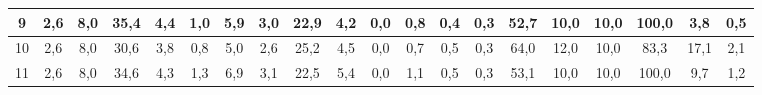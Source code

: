 \begin{sidewaystable}[]
\begin{tabular}{|c|c|c|c|c|c|c|c|c|c|c|c|c|c|c|c|c|c|c|c|}
    9  & 2,6                                              & 8,0                                              & 35,4                                             & 4,4                                              & 1,0                                              & 5,9                                              & 3,0                                              & 22,9                                             & 4,2                                              & 0,0                                              & 0,8                                              & 0,4                                              & 0,3                                              & 52,7                                            & 10,0                                            & 10,0                                            & 100,0                                           & 3,8                                             & 0,5                                             \\ \hline
    10 & 2,6                                              & 8,0                                              & 30,6                                             & 3,8                                              & 0,8                                              & 5,0                                              & 2,6                                              & 25,2                                             & 4,5                                              & 0,0                                              & 0,7                                              & 0,5                                              & 0,3                                              & 64,0                                            & 12,0                                            & 10,0                                            & 83,3                                            & 17,1                                            & 2,1                                             \\ \hline
    11 & 2,6                                              & 8,0                                              & 34,6                                             & 4,3                                              & 1,3                                              & 6,9                                              & 3,1                                              & 22,5                                             & 5,4                                              & 0,0                                              & 1,1                                              & 0,5                                              & 0,3                                              & 53,1                                            & 10,0                                            & 10,0                                            & 100,0                                           & 9,7                                             & 1,2                                             \\ \hline

\end{tabular}
\end{sidewaystable}

